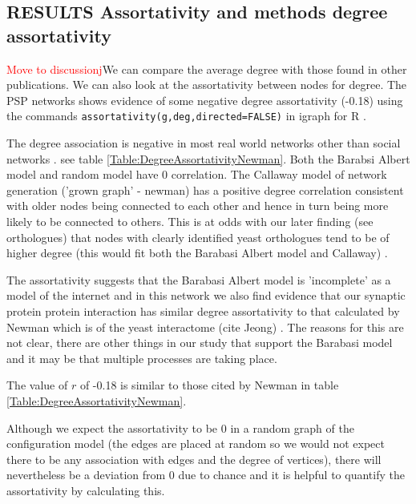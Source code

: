 \subsection{RESULTS Assortativity and methods degree assortativity}
\textcolor{red}{Move to discussionj}We can compare the average degree with those found in other publications. We can also look at the assortativity between nodes for degree. The PSP networks shows evidence of some negative degree assortativity (-0.18) using the commands \texttt{assortativity(g,deg,directed=FALSE)} in igraph for R .

The degree association is negative in most real world networks other than social networks \cite{newman2002assortative}.  see table \ref{Table:DegreeAssortativityNewman}. Both the Barabsi Albert model and random model have 0 correlation. The Callaway model of network generation ('grown graph' - newman) has a positive degree correlation consistent with older nodes being connected to each other and hence in turn being more likely to be connected to others. This is at odds with our later finding (see orthologues) that nodes with clearly identified yeast orthologues tend to be of higher degree (this would fit both the Barabasi Albert model and Callaway) . 

The assortativity suggests that the Barabasi Albert model is 'incomplete' as a model of the internet \cite{newman2002assortative} and in this network we also find evidence that our synaptic protein protein interaction has similar degree assortativity to that calculated by Newman which is of the yeast interactome (cite Jeong) . The reasons for this are not clear, there are other things in our study that support the Barabasi model and it may be that multiple processes are taking place. 

The value of $r$ of -0.18  is similar to those cited by Newman \cite{newman2002assortative} in table \ref{Table:DegreeAssortativityNewman}. 

Although we expect the assortativity to be 0 in a random graph of the configuration model (the edges are placed at random so we would not expect there to be any association with edges and the degree of vertices), there will nevertheless be a deviation from 0 due to chance and it is helpful to quantify the assortativity by calculating this. 

